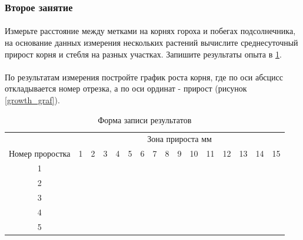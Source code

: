 	\subsubsection*{Второе занятие}
	
	\paragraph*{}Измерьте расстояние между метками на корнях гороха и побегах подсолнечника, на основание данных измерения нескольких растений вычислите среднесуточный прирост корня и стебля на разных участках. Запишите результаты опыта в \ref{growth_form}.
	
	\paragraph*{}По результатам измерения постройте график роста корня, где по оси абсцисс откладывается номер отрезка, а по оси ординат - прирост (рисунок \ref{growth_graf}). 
	
\begin{table}[h!]
\centering
\label{growth_form}
\caption{Форма записи результатов}
\begin{tabular}{|c|c|c|c|c|c|c|c|c|c|c|c|c|c|c|c|}
\hline & \multicolumn{15}{|c|}{Зона прироста мм}  \\ \cline{2-16}
 Номер проростка & 1 & 2 & 3 & 4 & 5 & 6 & 7 & 8 & 9 & 10 & 11 & 12 & 13 & 14 & 15 \\
\hline 1 & & & & & & & & & & & & & & & \\
\hline 2 & & & & & & & & & & & & & & & \\
\hline 3 & & & & & & & & & & & & & & & \\
\hline 4 & & & & & & & & & & & & & & & \\
\hline 5 & & & & & & & & & & & & & & & \\
\hline


\end{tabular}

\end{table}

